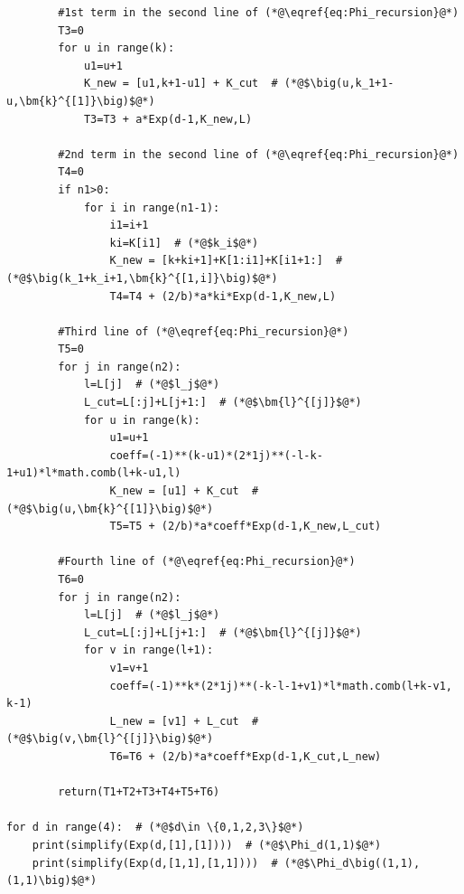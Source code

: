 \documentclass[10pt]{amsart}
\numberwithin{equation}{section}
\begin{document}
\begin{lstlisting}
        #1st term in the second line of (*@\eqref{eq:Phi_recursion}@*)
        T3=0
        for u in range(k):
            u1=u+1
            K_new = [u1,k+1-u1] + K_cut  # (*@$\big(u,k_1+1-u,\bm{k}^{[1]}\big)$@*)
            T3=T3 + a*Exp(d-1,K_new,L)
        
        #2nd term in the second line of (*@\eqref{eq:Phi_recursion}@*)
        T4=0
        if n1>0:
            for i in range(n1-1):
                i1=i+1
                ki=K[i1]  # (*@$k_i$@*)
                K_new = [k+ki+1]+K[1:i1]+K[i1+1:]  # (*@$\big(k_1+k_i+1,\bm{k}^{[1,i]}\big)$@*)
                T4=T4 + (2/b)*a*ki*Exp(d-1,K_new,L)

        #Third line of (*@\eqref{eq:Phi_recursion}@*)
        T5=0
        for j in range(n2):
            l=L[j]  # (*@$l_j$@*)
            L_cut=L[:j]+L[j+1:]  # (*@$\bm{l}^{[j]}$@*)
            for u in range(k):
                u1=u+1
                coeff=(-1)**(k-u1)*(2*1j)**(-l-k-1+u1)*l*math.comb(l+k-u1,l)
                K_new = [u1] + K_cut  # (*@$\big(u,\bm{k}^{[1]}\big)$@*)
                T5=T5 + (2/b)*a*coeff*Exp(d-1,K_new,L_cut)
                
        #Fourth line of (*@\eqref{eq:Phi_recursion}@*)
        T6=0
        for j in range(n2):
            l=L[j]  # (*@$l_j$@*)
            L_cut=L[:j]+L[j+1:]  # (*@$\bm{l}^{[j]}$@*)
            for v in range(l+1):
                v1=v+1
                coeff=(-1)**k*(2*1j)**(-k-l-1+v1)*l*math.comb(l+k-v1, k-1)
                L_new = [v1] + L_cut  # (*@$\big(v,\bm{l}^{[j]}\big)$@*)
                T6=T6 + (2/b)*a*coeff*Exp(d-1,K_cut,L_new)
        
        return(T1+T2+T3+T4+T5+T6)

for d in range(4):  # (*@$d\in \{0,1,2,3\}$@*)
    print(simplify(Exp(d,[1],[1])))  # (*@$\Phi_d(1,1)$@*)
    print(simplify(Exp(d,[1,1],[1,1])))  # (*@$\Phi_d\big((1,1),(1,1)\big)$@*)

\end{lstlisting}
\end{document}
